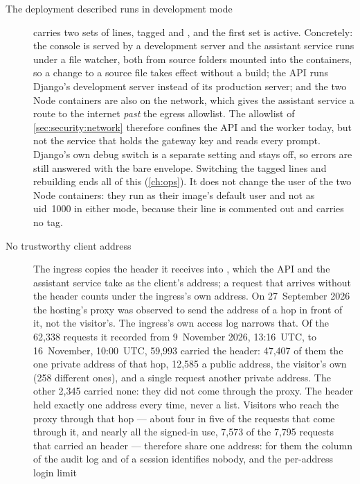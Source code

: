 \begin{description}
  \item[The deployment described runs in development mode]
     carries two sets of lines, tagged  and ,
    and the first set is active. Concretely: the console is served by a development server
    and the assistant service runs under a file watcher, both from source folders mounted
    into the containers, so a change to a source file takes effect without a build; the API
    runs Django's development server instead of its production server; and the two Node
    containers are also on
    the  network, which gives the assistant service a route to the internet
    \emph{past} the egress allowlist. The allowlist of \cref{sec:security:network} therefore
    confines the API and the worker today, but not the service that holds the gateway key
    and reads every prompt. Django's own debug switch is a separate setting and stays off,
    so errors are still answered with the bare envelope. Switching the tagged lines and
    rebuilding ends all of this (\cref{ch:ops}). It does not change the user of the two Node
    containers: they run as their image's default user and not as uid~1000 in either mode,
    because their  line is commented out and carries no tag.
  \item[No trustworthy client address] The ingress copies the 
    header it receives into , which the API and the assistant service take
    as the client's address; a request that arrives without the header counts under the
    ingress's own address. On 27~September 2026 the hosting's proxy was observed to send
    the address of a hop in front of it, not the visitor's. The ingress's own access log
    narrows that. Of the 62,338 requests it recorded from 9~November 2026, 13:16~UTC, to
    16~November, 10:00~UTC, 59,993 carried the header: 47,407 of them the one private address
    of that hop, 12,585 a public address, the visitor's own (258 different ones), and a single
    request another private address. The other 2,345 carried none: they did not come through the
    proxy. The header held exactly
    one address every time, never a list. Visitors who reach the proxy through that hop ---
    about four in five of the requests that come through it, and nearly all the signed-in
    use, 7,573 of the 7,795 requests that carried an  header ---
    therefore share one address: for them the  column of the
    audit log and of a session identifies nobody, and the per-address login limit

\end{description}

